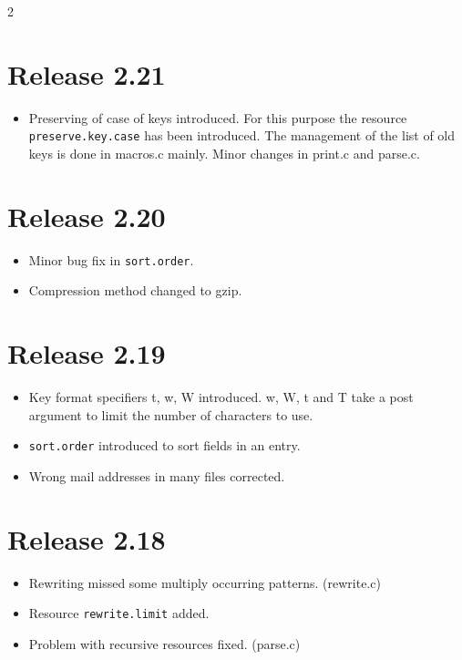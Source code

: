 \documentclass[11pt,a4paper]{scrartcl}
\newcommand\rsc[1]{\texttt{#1}}
\newcommand\File[1]{\textsf{#1}}
\newenvironment{Releases}{\begin{multicols}2\RaggedRight}{\end{multicols}}
\newenvironment{Release}[2]{%
  \def\tmp{#2}%
  \section*{Release #1 \ifx\tmp\empty\else{\normalsize[#2]}\fi}
  \begin{itemize}
}{\end{itemize}}
\newenvironment{Fix}[1]{\item }{}
\newenvironment{New}[1]{\item }{}
\newenvironment{Update}[1]{\item }{}
\begin{document}
\begin{Releases}
 \begin{Release}{2.21}{}
  \begin{New}{gene}
    Preserving of case of keys introduced. For this purpose the
    resource \rsc{preserve.key.case} has been introduced. The
    management of the list of old keys is done in \File{macros.c}
    mainly. Minor changes in \File{print.c} and \File{parse.c}.
  \end{New}
 \end{Release}

 \begin{Release}{2.20}{}
  \begin{Fix}{gene}
    Minor bug fix in \rsc{sort.order}.
  \end{Fix}
  \begin{Update}{gene}
    Compression method changed to gzip.
  \end{Update}
 \end{Release}

 \begin{Release}{2.19}{}
  \begin{New}{gene}
    Key format specifiers t, w, W introduced. w, W, t and T take a
    post argument to limit the number of characters to use.
  \end{New}
  \begin{New}{gene}
    \rsc{sort.order} introduced to sort fields in an entry.
  \end{New}
  \begin{Update}{gene}
    Wrong mail addresses in many files corrected.
  \end{Update}
 \end{Release}

 \begin{Release}{2.18}{}
  \begin{Fix}{gene}
    Rewriting missed some multiply occurring patterns.
    (\File{rewrite.c})
  \end{Fix}
  \begin{New}{gene}
    Resource \rsc{rewrite.limit} added.
  \end{New}
  \begin{Fix}{gene}
    Problem with recursive resources fixed. (\File{parse.c})
  \end{Fix}
 \end{Release}


\end{Releases}
\end{document}
